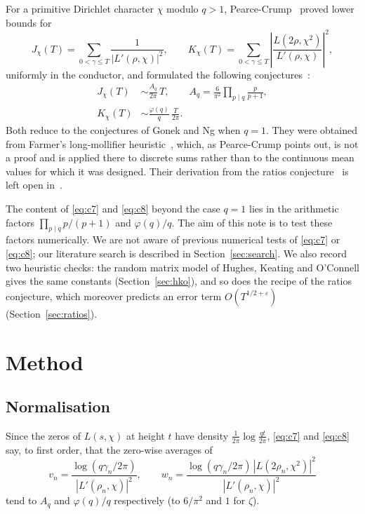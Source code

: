 \documentclass[11pt]{amsart}
\newcommand{\Lp}{L'}
\begin{document}
For a primitive Dirichlet character $\chi$ modulo $q>1$, Pearce-Crump~\cite{PC} proved lower bounds for
\[
J_\chi(T)=\sum_{0<\gamma\le T}\frac{1}{|\Lp(\rho,\chi)|^{2}},\qquad
K_\chi(T)=\sum_{0<\gamma\le T}\left|\frac{L(2\rho,\chi^{2})}{\Lp(\rho,\chi)}\right|^{2},
\]
uniformly in the conductor, and formulated the following conjectures~\cite[Conjectures~7 and~8]{PC}:
\begin{align}
J_\chi(T)&\sim\frac{A_q}{2\pi}\,T,\qquad A_q=\frac{6}{\pi^{2}}\prod_{p\mid q}\frac{p}{p+1},\label{eq:c7}\\
K_\chi(T)&\sim\frac{\varphi(q)}{q}\,\frac{T}{2\pi}.\label{eq:c8}
\end{align}
Both reduce to the conjectures of Gonek and Ng when $q=1$. They were obtained from Farmer's long-mollifier
heuristic~\cite{Farmer}, which, as Pearce-Crump points out, is not a proof and is applied there to discrete sums
rather than to the continuous mean values for which it was designed. Their derivation from the ratios
conjecture~\cite{CFZ,CS} is left open in~\cite{PC}.

The content of \eqref{eq:c7} and \eqref{eq:c8} beyond the case $q=1$ lies in the arithmetic factors
$\prod_{p\mid q}p/(p+1)$ and $\varphi(q)/q$. The aim of this note is to test these factors numerically. We are not aware
of previous numerical tests of \eqref{eq:c7} or \eqref{eq:c8}; our literature search is described in
Section~\ref{sec:search}. We also record two heuristic checks: the random matrix model of Hughes, Keating and O'Connell
gives the same constants (Section~\ref{sec:hko}), and so does the recipe of the ratios conjecture, which moreover
predicts an error term $O(T^{1/2+\varepsilon})$ (Section~\ref{sec:ratios}).

\section{Method}

\subsection{Normalisation}
Since the zeros of $L(s,\chi)$ at height $t$ have density $\frac{1}{2\pi}\log\frac{qt}{2\pi}$, \eqref{eq:c7} and
\eqref{eq:c8} say, to first order, that the zero-wise averages of
\[
v_n=\frac{\log(q\gamma_n/2\pi)}{|\Lp(\rho_n,\chi)|^{2}},\qquad
w_n=\frac{\log(q\gamma_n/2\pi)\,|L(2\rho_n,\chi^{2})|^{2}}{|\Lp(\rho_n,\chi)|^{2}}
\]
tend to $A_q$ and $\varphi(q)/q$ respectively (to $6/\pi^2$ and $1$ for $\zeta$).
\end{document}
